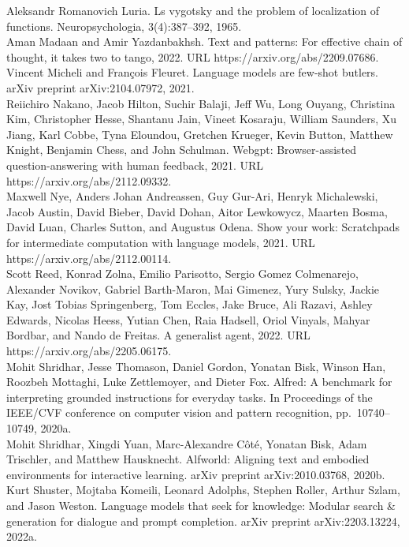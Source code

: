 \documentclass[
]{article}
\begin{document}
Aleksandr Romanovich Luria. Ls vygotsky and the problem of localization
of functions. Neuropsychologia, 3(4):387--392, 1965.\\
Aman Madaan and Amir Yazdanbakhsh. Text and patterns: For effective
chain of thought, it takes two to tango, 2022. URL
https://arxiv.org/abs/2209.07686.\\
Vincent Micheli and François Fleuret. Language models are few-shot
butlers. arXiv preprint arXiv:2104.07972, 2021.\\
Reiichiro Nakano, Jacob Hilton, Suchir Balaji, Jeff Wu, Long Ouyang,
Christina Kim, Christopher Hesse, Shantanu Jain, Vineet Kosaraju,
William Saunders, Xu Jiang, Karl Cobbe, Tyna Eloundou, Gretchen Krueger,
Kevin Button, Matthew Knight, Benjamin Chess, and John Schulman. Webgpt:
Browser-assisted question-answering with human feedback, 2021. URL
https://arxiv.org/abs/2112.09332.\\
Maxwell Nye, Anders Johan Andreassen, Guy Gur-Ari, Henryk Michalewski,
Jacob Austin, David Bieber, David Dohan, Aitor Lewkowycz, Maarten Bosma,
David Luan, Charles Sutton, and Augustus Odena. Show your work:
Scratchpads for intermediate computation with language models, 2021. URL
https://arxiv.org/abs/2112.00114.\\
Scott Reed, Konrad Zolna, Emilio Parisotto, Sergio Gomez Colmenarejo,
Alexander Novikov, Gabriel Barth-Maron, Mai Gimenez, Yury Sulsky, Jackie
Kay, Jost Tobias Springenberg, Tom Eccles, Jake Bruce, Ali Razavi,
Ashley Edwards, Nicolas Heess, Yutian Chen, Raia Hadsell, Oriol Vinyals,
Mahyar Bordbar, and Nando de Freitas. A generalist agent, 2022. URL
https://arxiv.org/abs/2205.06175.\\
Mohit Shridhar, Jesse Thomason, Daniel Gordon, Yonatan Bisk, Winson Han,
Roozbeh Mottaghi, Luke Zettlemoyer, and Dieter Fox. Alfred: A benchmark
for interpreting grounded instructions for everyday tasks. In
Proceedings of the IEEE/CVF conference on computer vision and pattern
recognition, pp.~10740--10749, 2020a.\\
Mohit Shridhar, Xingdi Yuan, Marc-Alexandre Côté, Yonatan Bisk, Adam
Trischler, and Matthew Hausknecht. Alfworld: Aligning text and embodied
environments for interactive learning. arXiv preprint arXiv:2010.03768,
2020b.\\
Kurt Shuster, Mojtaba Komeili, Leonard Adolphs, Stephen Roller, Arthur
Szlam, and Jason Weston. Language models that seek for knowledge:
Modular search \& generation for dialogue and prompt completion. arXiv
preprint arXiv:2203.13224, 2022a.\\
\end{document}
